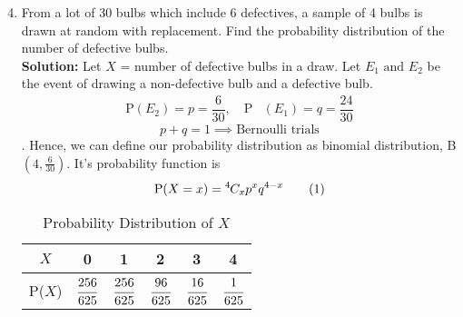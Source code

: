 \documentclass[journal,12pt,twocolumn]{IEEEtran}
\providecommand{\brak}[1]{\ensuremath{\left(#1\right)}}
\newcommand{\solution}{\noindent \textbf{Solution: }}
\newcommand*{\permcomb}[4][0mu]{{{}^{#3}\mkern#1#2_{#4}}}
\newcommand*{\comb}[1][-1mu]{\permcomb[#1]{C}}
\newcommand\numberthis{\addtocounter{equation}{1}\tag{\theequation}}
\newcommand\T{\rule{0pt}{2.6ex}}       %
\begin{document}
\begin{enumerate}[label=13.\arabic{enumi}.\arabic{enumii}]
\setcounter{enumi}{3}
\setcounter{enumii}{6}
\item From a lot of 30 bulbs which include 6 defectives, a sample of 4 bulbs is drawn at random with replacement. Find the probability distribution of the number of defective bulbs.\\
	\solution
		Let $X$ = number of defective bulbs in a draw. Let $E_1 \text{ and } E_2$ be the event of drawing a non-defective bulb and a defective bulb.
	\begin{align*}
		\text{P}(E_2)= p = \dfrac{6}{30}, \quad \text{P}&(E_1)= q = \dfrac{24}{30}
	\end{align*}
		\[p+q=1 \implies \text{Bernoulli trials}\].
		Hence, we can define our probability distribution as binomial distribution, B$\brak{4,\frac{6}{30}}$. It's probability function is \[\text{P($X=x$)}=\comb{4}{x}p^xq^{4-x} \numberthis \]
	\begin{table}[h!]
	\normalsize
	\centering
			\begin{tabular}[20pt]{|>{}c|a|a|a|a|a|} \hline
			$X$&0&1&2&3&4 \T \\ \hline
			P($X$)&$\cfrac{256}{625}$&$\cfrac{256}{625}$&$\cfrac{96}{625}$&$\cfrac{16}{625}$&$\cfrac{1}{625}$\\[1.5ex] \hline
		\end{tabular}\\[2ex]
		\caption{Probability Distribution of $X$}
	\end{table}

\noindent{}

\end{enumerate}
\end{document}
